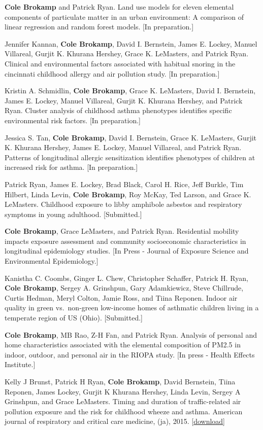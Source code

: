 
\textbf{Cole Brokamp} and Patrick Ryan. Land use models for eleven
elemental components of particulate matter in an urban environment: A
comparison of linear regression and random forest models. {[}In
preparation.{]}

Jennifer Kannan, \textbf{Cole Brokamp}, David I. Bernstein, James E.
Lockey, Manuel Villareal, Gurjit K. Khurana Hershey, Grace K. LeMasters,
and Patrick Ryan. Clinical and environmental factors associated with
habitual snoring in the cincinnati childhood allergy and air pollution
study. {[}In preparation.{]}

Kristin A. Schmidlin, \textbf{Cole Brokamp}, Grace K. LeMasters, David
I. Bernstein, James E. Lockey, Manuel Villareal, Gurjit K. Khurana
Hershey, and Patrick Ryan. Cluster analysis of childhood asthma
phenotypes identifies specific environmental risk factors. {[}In
preparation.{]}

Jessica S. Tan, \textbf{Cole Brokamp}, David I. Bernstein, Grace K.
LeMasters, Gurjit K. Khurana Hershey, James E. Lockey, Manuel Villareal,
and Patrick Ryan. Patterns of longitudinal allergic sensitization
identifies phenotypes of children at increased risk for asthma. {[}In
preparation.{]}

Patrick Ryan, James E. Lockey, Brad Black, Carol H. Rice, Jeff Burkle,
Tim Hilbert, Linda Levin, \textbf{Cole Brokamp}, Roy McKay, Ted Larson,
and Grace K. LeMasters. Childhood exposure to libby amphibole asbestos
and respiratory symptoms in young adulthood. {[}Submitted.{]}

\textbf{Cole Brokamp}, Grace LeMasters, and Patrick Ryan. Residential
mobility impacts exposure assessment and community socioeconomic
characteristics in longitudinal epidemiology studies. {[}In Press -
Journal of Exposure Science and Environmental Epidemiology.{]}

Kanistha C. Coombs, Ginger L. Chew, Christopher Schaffer, Patrick H.
Ryan, \textbf{Cole Brokamp}, Sergey A. Grinshpun, Gary Adamkiewicz,
Steve Chillrude, Curtis Hedman, Meryl Colton, Jamie Ross, and Tiina
Reponen. Indoor air quality in green vs.~non-green low-income homes of
asthmatic children living in a temperate region of US (Ohio).
{[}Submitted.{]}

\textbf{Cole Brokamp}, MB Rao, Z-H Fan, and Patrick Ryan. Analysis of
personal and home characteristics associated with the elemental
composition of PM2.5 in indoor, outdoor, and personal air in the RIOPA
study. {[}In press - Health Effects Institute.{]}

Kelly J Brunst, Patrick H Ryan, \textbf{Cole Brokamp}, David Bernstein,
Tiina Reponen, James Lockey, Gurjit K Khurana Hershey, Linda Levin,
Sergey A Grinshpun, and Grace LeMasters. Timing and duration of
traffic-related air pollution exposure and the risk for childhood wheeze
and asthma. American journal of respiratory and critical care medicine,
(ja), 2015.
\href{https://github.com/cole-brokamp/cole-brokamp.github.io/raw/master/publications/rccm\%252E201407-1314oc.pdf}{{[}download{]}}

